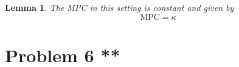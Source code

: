 \documentclass[11pt]{extarticle}
\theoremstyle{plain}
\newtheorem{lem}[thm]{Lemma}
\theoremstyle{definition}
\begin{document}
\begin{enumerate}[(a)]
\vspace{3mm}
\noindent
\begin{lem}
	The MPC in this setting is constant and given by
	\begin{equation*}
		\text{MPC} = \kappa
	\end{equation*}
	
\end{lem}

\end{enumerate}

\vspace{10mm}
\section*{Problem 6 **}
\end{document}
